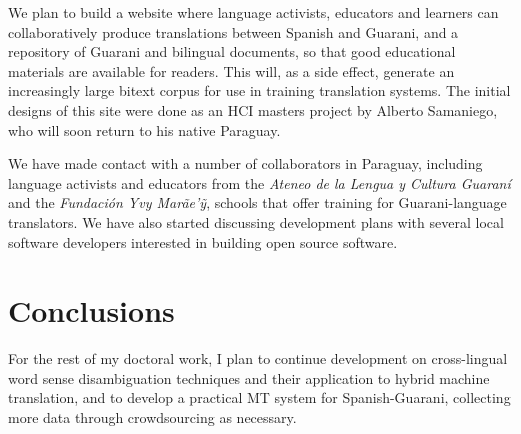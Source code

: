 \documentclass{article}
\begin{document}
We plan to build a website where language activists, educators and learners can
collaboratively produce translations between Spanish and Guarani, and a
repository of Guarani and bilingual documents, so that good educational
materials are available for readers. This will, as a side effect, generate an
increasingly large bitext corpus for use in training translation systems.  The
initial designs of this site were done as an HCI masters project by Alberto
Samaniego, who will soon return to his native Paraguay.

We have made contact with a number of collaborators in Paraguay, including
language activists and educators from the \emph{Ateneo de la Lengua y Cultura
Guaraní} and the \emph{Fundación Yvy Marãe'{\~y}}, schools that offer training
for Guarani-language translators. We have also started discussing development
plans with several local software developers interested in building open source
software.

\section{Conclusions}
For the rest of my doctoral work, I plan to continue development on
cross-lingual word sense disambiguation techniques and their application to
hybrid machine translation, and to develop a practical MT system for
Spanish-Guarani, collecting more data through crowdsourcing as necessary.



{}
\end{document}

